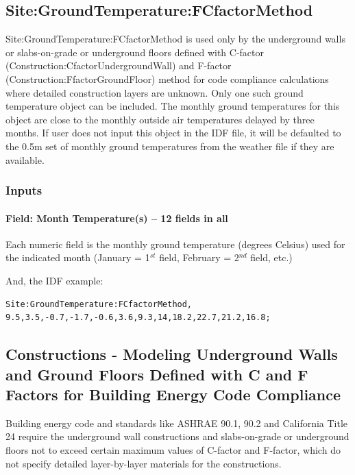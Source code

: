 \subsection{Site:GroundTemperature:FCfactorMethod}\label{sitegroundtemperaturefcfactormethod-000}

Site:GroundTemperature:FCfactorMethod is used only by the underground walls or slabs-on-grade or underground floors defined with C-factor (Construction:CfactorUndergroundWall) and F-factor (Construction:FfactorGroundFloor) method for code compliance calculations where detailed construction layers are unknown. Only one such ground temperature object can be included. The monthly ground temperatures for this object are close to the monthly outside air temperatures delayed by three months. If user does not input this object in the IDF file, it will be defaulted to the 0.5m set of monthly ground temperatures from the weather file if they are available.

\subsubsection{Inputs}\label{inputs-35-000}

\paragraph{Field: Month Temperature(s) -- 12 fields in all}\label{field-month-temperatures-12-fields-in-all-000}

Each numeric field is the monthly ground temperature (degrees Celsius) used for the indicated month (January = 1\(^{st}\) field, February = 2\(^{nd}\) field, etc.)

And, the IDF example:

\begin{lstlisting}
Site:GroundTemperature:FCfactorMethod,  9.5,3.5,-0.7,-1.7,-0.6,3.6,9.3,14,18.2,22.7,21.2,16.8;
\end{lstlisting}

\subsection{Constructions - Modeling Underground Walls and Ground Floors Defined with C and F Factors for Building Energy Code Compliance}\label{constructions---modeling-underground-walls-and-ground-floors-defined-with-c-and-f-factors-for-building-energy-code-compliance}

Building energy code and standards like ASHRAE 90.1, 90.2 and California Title 24 require the underground wall constructions and slabs-on-grade or underground floors not to exceed certain maximum values of C-factor and F-factor, which do not specify detailed layer-by-layer materials for the constructions.

